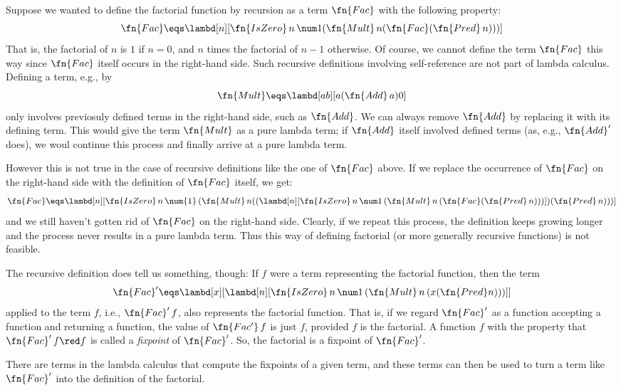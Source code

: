 \documentclass[../../../include/open-logic-section]{subfiles}
\begin{document}


Suppose we wanted to define the factorial function by recursion as a
term $\fn{Fac}$ with the following property:
\[
\fn{Fac} \eqs \lambd[n][\fn{IsZero}\, n\, \num 1 (\fn{Mult}\, n (\fn{Fac}(\fn{Pred} \, n)))]
\]
That is, the factorial of $n$ is $1$ if $n = 0$, and $n$ times the
factorial of $n-1$ otherwise.  Of course, we cannot define the term
$\fn{Fac}$ this way since $\fn{Fac}$ itself occurs in the right-hand
side. Such recursive definitions involving self-reference
are not part of lambda calculus. Defining a term, e.g., by
\[
\fn{Mult} \eqs \lambd[ab][a (\fn{Add}\, a) 0]
\]
only involves previosuly defined terms in the right-hand side, such as
$\fn{Add}$. We can always remove $\fn{Add}$ by replacing it with its
defining term.  This would give the term $\fn{Mult}$ as a pure lambda
term; if $\fn{Add}$ itself involved defined terms (as, e.g.,
$\fn{Add}'$ does), we woul continue this process and finally arrive at
a pure lambda term.

However this is not true in the case of recursive definitions like the
one of $\fn{Fac}$ above. If we replace the occurrence of $\fn{Fac}$ on
the right-hand side with the definition of $\fn{Fac}$ itself, we get:
\[
\fn{Fac} \eqs \lambd[n][\fn{IsZero}\, n\, \num{1}\, (\fn{Mult}\, n
  ((\lambd[n][\fn{IsZero} \, n \, \num 1\, (\fn{Mult}\, n\, (\fn{Fac}
    (\fn{Pred}\, n)))]) (\fn{Pred}\, n)))]
\]
and we still haven't gotten rid of $\fn{Fac}$ on the right-hand
side. Clearly, if we repeat this process, the definition keeps growing
longer and the process never results in a pure lambda term. Thus this
way of defining factorial (or more generally recursive functions)
is not feasible.

The recursive definition does tell us something, though: If $f$ were a
term representing the factorial function, then the term
\[
\fn{Fac}' \eqs \lambd[x][\lambd[n][\fn{IsZero} \, n \, \num 1\, (\fn{Mult} \, n\, (x (\fn{Pred} n)))]]
\]
applied to the term $f$, i.e., $\fn{Fac}'\,f$, also represents the
factorial function.  That is, if we regard $\fn{Fac}'$ as a function
accepting a function and returning a function, the value of
$\fn{Fac'}\, f$ is just $f$, provided $f$ is the factorial. A function
$f$ with the property that $\fn{Fac}' \, f \red f$ is called a
\emph{fixpoint} of $\fn{Fac}'$. So, the factorial is a fixpoint of
$\fn{Fac}'$.

There are terms in the lambda calculus that compute the fixpoints of a
given term, and these terms can then be used to turn a term like
$\fn{Fac}'$ into the definition of the factorial.
\end{document}
